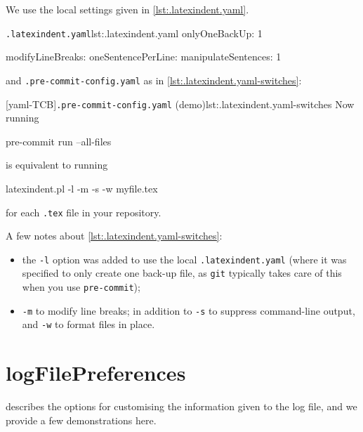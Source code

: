   \begin{example}
  We use the local settings given in \cref{lst:.latexindent.yaml}.
  \begin{cmhlistings}[style=tcblatex]{\texttt{.latexindent.yaml}}{lst:.latexindent.yaml}
onlyOneBackUp: 1

modifyLineBreaks:
 oneSentencePerLine:
   manipulateSentences: 1
\end{cmhlistings}

  and \texttt{.pre-commit-config.yaml} as in \cref{lst:.latexindent.yaml-switches}:

  [yaml-TCB]{\texttt{.pre-commit-config.yaml} (demo)}{lst:.latexindent.yaml-switches}
  Now running

  \begin{commandshell}
pre-commit run --all-files  
\end{commandshell}

  is equivalent to running

  \begin{commandshell}
latexindent.pl -l -m -s -w myfile.tex
\end{commandshell}

  for each \texttt{.tex} file in your repository.

  A few notes about \cref{lst:.latexindent.yaml-switches}:
  \begin{itemize}
   \item the \texttt{-l} option was added to use the local \texttt{.latexindent.yaml}
         (where it was specified to only create one back-up file, as \texttt{git}
         typically takes care of this when you use \texttt{pre-commit});
   \item \texttt{-m} to modify line breaks; in addition to \texttt{-s} to suppress command-line
         output, and \texttt{-w} to format files in place.
  \end{itemize}
  \end{example}

 \section{logFilePreferences}\label{app:logfile-demo}
   describes the options for customising the information given
  to the log file, and we provide a few demonstrations here.

